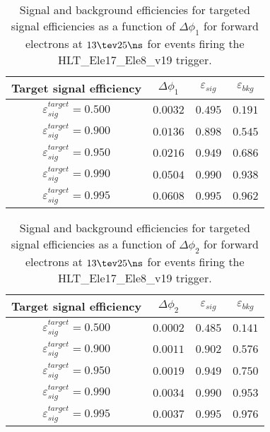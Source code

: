 \clearpage

\begin{table}[!bht]
  \begin{center}
    \begin{tabular}{cccc}
      \hline
      Target signal efficiency & $\Delta\phi_1$ & $\varepsilon_{sig}$ & $\varepsilon_{bkg}$ \\ 
      \hline
      $\varepsilon_{sig}^{target} = 0.500$ & $  0.0032$ & $0.495$ & $0.191$ \\
      $\varepsilon_{sig}^{target} = 0.900$ & $  0.0136$ & $0.898$ & $0.545$ \\
      $\varepsilon_{sig}^{target} = 0.950$ & $  0.0216$ & $0.949$ & $0.686$ \\
      $\varepsilon_{sig}^{target} = 0.990$ & $  0.0504$ & $0.990$ & $0.938$ \\
      $\varepsilon_{sig}^{target} = 0.995$ & $  0.0608$ & $0.995$ & $0.962$ \\
      \hline
    \end{tabular}
    \caption{Signal and background efficiencies for targeted signal efficiencies as a function of $\Delta\phi_1$ for forward electrons at $13\tev 25\ns$ for events firing the HLT\_Ele17\_Ele8\_v19 trigger.}
    \label{tab:eff_rej_phi1_beam_13_25_trigger_17_8_F}
  \end{center}
\end{table}

\clearpage

\begin{table}[!bht]
  \begin{center}
    \begin{tabular}{cccc}
      \hline
      Target signal efficiency & $\Delta\phi_2$ & $\varepsilon_{sig}$ & $\varepsilon_{bkg}$ \\ 
      \hline
      $\varepsilon_{sig}^{target} = 0.500$ & $  0.0002$ & $0.485$ & $0.141$ \\
      $\varepsilon_{sig}^{target} = 0.900$ & $  0.0011$ & $0.902$ & $0.576$ \\
      $\varepsilon_{sig}^{target} = 0.950$ & $  0.0019$ & $0.949$ & $0.750$ \\
      $\varepsilon_{sig}^{target} = 0.990$ & $  0.0034$ & $0.990$ & $0.953$ \\
      $\varepsilon_{sig}^{target} = 0.995$ & $  0.0037$ & $0.995$ & $0.976$ \\
      \hline
    \end{tabular}
    \caption{Signal and background efficiencies for targeted signal efficiencies as a function of $\Delta\phi_2$ for forward electrons at $13\tev 25\ns$ for events firing the HLT\_Ele17\_Ele8\_v19 trigger.}
    \label{tab:eff_rej_phi2_beam_13_25_trigger_17_8_F}
  \end{center}
\end{table}

